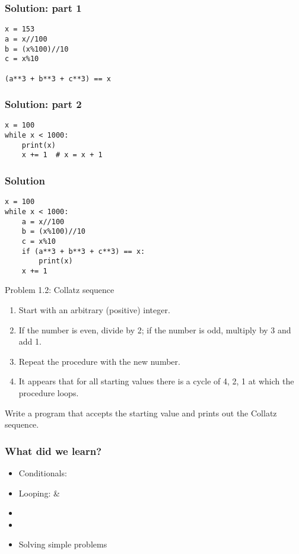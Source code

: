 \documentclass[14pt,compress]{beamer}
\begin{document}
\begin{frame}[fragile]
  \frametitle{Solution: part 1}
\begin{lstlisting}
x = 153
a = x//100
b = (x%100)//10
c = x%10

(a**3 + b**3 + c**3) == x
\end{lstlisting}
\end{frame}

\begin{frame}[fragile]
  \frametitle{Solution: part 2}
\begin{lstlisting}
x = 100
while x < 1000:
    print(x)
    x += 1  # x = x + 1
\end{lstlisting}
\end{frame}

\begin{frame}[fragile]
  \frametitle{Solution}
\begin{lstlisting}
x = 100
while x < 1000:
    a = x//100
    b = (x%100)//10
    c = x%10
    if (a**3 + b**3 + c**3) == x:
        print(x)
    x += 1
\end{lstlisting}
\end{frame}


\begin{frame}{Problem 1.2: Collatz sequence}
\begin{enumerate}
  \item Start with an arbitrary (positive) integer.
  \item If the number is even, divide by 2; if the number is odd, multiply by 3 and add 1.
  \item Repeat the procedure with the new number.
  \item It appears that for all starting values there is a cycle of 4, 2, 1 at which the procedure loops.
\end{enumerate}
    Write a program that accepts the starting value and prints out the Collatz sequence.
\end{frame}


\begin{frame}[fragile]
  \frametitle{What did we learn?}
  \begin{itemize}
    \item Conditionals: 
    \item Looping:  \& 
    \item {}
    \item {}
    \item Solving simple problems
  \end{itemize}
\end{frame}
\end{document}
